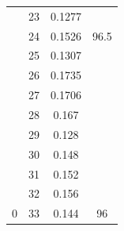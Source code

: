 \documentclass{article}
\begin{document}
\begin{multicols}{2}
\begin{table}[H]
\begin{tabular}{|c|c|c|c|}
 & 23 & 0.1277 &  \\ \cline{2-3}
 & 24 & 0.1526 & \multirow{-2}{*}{96.5} \\ \cline{2-4} 
 & 25 & 0.1307 &  \\ \cline{2-3}
 & 26 & 0.1735 &  \\ \cline{2-3}
 & 27 & 0.1706 &  \\ \cline{2-3}
 & 28 & 0.167 &  \\ \cline{2-3}
 & 29 & 0.128 &  \\ \cline{2-3}
 & 30 & 0.148 &  \\ \cline{2-3}
 & 31 & 0.152 &  \\ \cline{2-3}
 & 32 & 0.156 &  \\ \cline{2-3}
\multirow{-34}{*}{0} & 33 & 0.144 & \multirow{-9}{*}{96} \\ \hline
\end{tabular}
\end{table}



\end{multicols}
\end{document}

